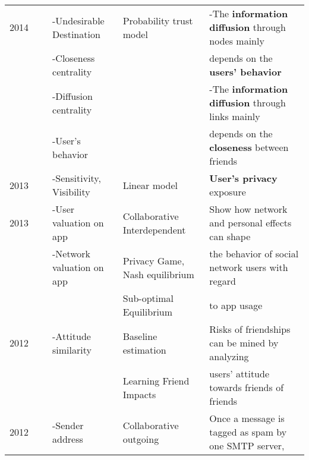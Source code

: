 \begin{longtable}{lllll}
	2014  & \cite{zeng_trustaware_2014}                    & -Undesirable Destination         & Probability trust model          & -The \textbf{information diffusion} through nodes mainly      \\
	\     & \                                              & -Closeness centrality            &                                  & depends on the \textbf{users’ behavior}                       \\
	\     & \                                              & -Diffusion centrality            &                                  & -The \textbf{information diffusion} through links mainly      \\
	\     & \                                              & -User's behavior                 &                                  & depends on the \textbf{closeness} between friends             \\\hline
	2013  & \cite{nepali_sonet_2013}                       & -Sensitivity, Visibility         & Linear model                     & \textbf{User’s privacy} exposure                              \\\hline
	2013  & \cite{biczok_interdependent_2013}              & -User valuation on app           & Collaborative Interdependent     & Show how network and personal effects can shape               \\
	\     & \                                              & -Network valuation on app        & Privacy Game, Nash equilibrium   & the behavior of social network users with regard              \\
	\     & \                                              &                                  & Sub-optimal Equilibrium          & to app usage                                                  \\\hline
	2012  & \cite{akcora_risks_2012}                       & -Attitude similarity             & Baseline estimation              & Risks of friendships can be mined by analyzing                \\
	\     &                                                &                                  & Learning Friend Impacts          & users’ attitude towards friends of friends                    \\\hline
	2012  & \cite{ahmad_coat_2012}                         & -Sender address                  & Collaborative outgoing           & Once a message is tagged as spam by one SMTP server,          \\

\end{longtable}
